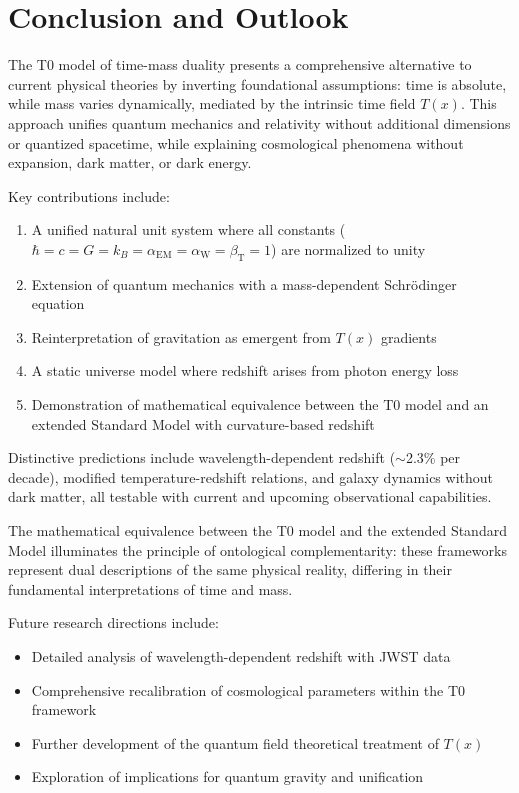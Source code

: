 \documentclass[aps,prl,twocolumn,superscriptaddress,nofootinbib]{revtex4-2}
\newcommand{\Tfield}{T(x)}
\newcommand{\alphaEM}{\alpha_{\text{EM}}}
\newcommand{\alphaW}{\alpha_{\text{W}}}
\newcommand{\betaT}{\beta_{\text{T}}}
\begin{document}
	\section{Conclusion and Outlook}
	\label{sec:conclusion}
	
	The T0 model of time-mass duality presents a comprehensive alternative to current physical theories by inverting foundational assumptions: time is absolute, while mass varies dynamically, mediated by the intrinsic time field $\Tfield$. This approach unifies quantum mechanics and relativity without additional dimensions or quantized spacetime, while explaining cosmological phenomena without expansion, dark matter, or dark energy.
	
	Key contributions include:
	\begin{enumerate}
		\item A unified natural unit system where all constants ($\hbar = c = G = k_B = \alphaEM = \alphaW = \betaT = 1$) are normalized to unity
		\item Extension of quantum mechanics with a mass-dependent Schrödinger equation
		\item Reinterpretation of gravitation as emergent from $\Tfield$ gradients
		\item A static universe model where redshift arises from photon energy loss
		\item Demonstration of mathematical equivalence between the T0 model and an extended Standard Model with curvature-based redshift
	\end{enumerate}
	
	Distinctive predictions include wavelength-dependent redshift ($\sim$2.3\% per decade), modified temperature-redshift relations, and galaxy dynamics without dark matter, all testable with current and upcoming observational capabilities.
	
	The mathematical equivalence between the T0 model and the extended Standard Model illuminates the principle of ontological complementarity: these frameworks represent dual descriptions of the same physical reality, differing in their fundamental interpretations of time and mass.
	
	Future research directions include:
	\begin{itemize}
		\item Detailed analysis of wavelength-dependent redshift with JWST data
		\item Comprehensive recalibration of cosmological parameters within the T0 framework
		\item Further development of the quantum field theoretical treatment of $\Tfield$
		\item Exploration of implications for quantum gravity and unification
	\end{itemize}
	
\end{document}
